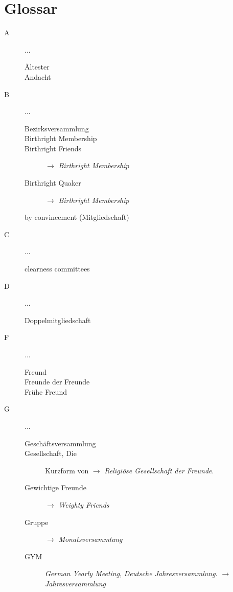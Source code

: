 \chapter{Glossar}
\begin{description}
 \item[A] ...
\begin{description}
 \item[Ältester]
 \item[Andacht]
 \end{description}
 \item[B] ...
\begin{description}
 \item[Bezirksversammlung]
 \item[Birthright Membership]
 \item[Birthright Friends] $\to$ \textit{Birthright Membership}
 \item[Birthright Quaker] $\to$ \textit{Birthright Membership}
 \item[by convincement (Mitgliedschaft)]
 \end{description}
 \item[C]...
\begin{description}
 \item[clearness committees]
 \end{description}
 \item[D]...
\begin{description}
 \item[Doppelmitgliedschaft]
 \end{description}
 \item[F]...
\begin{description}
 \item[Freund]
 \item[Freunde der Freunde]
 \item[Frühe Freund]
 \end{description}
 \item[G]...
\begin{description}
 \item[Geschäftsversammlung]
 \item[Gesellschaft, Die] Kurzform von $\to$ \textit{Religiöse Gesellschaft der Freunde}.
 \item[Gewichtige Freunde] $\to$ \textit{Weighty Friends}
 \item[Gruppe] $\to$ \textit{Monatsversammlung}
 \item[GYM] \textit{German Yearly Meeting}, \textit{Deutsche Jahresversammlung}. $\to$ \textit{Jahresversammlung}

\end{description}
\end{description}
